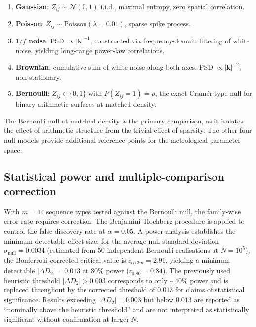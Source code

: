 \documentclass[final,1p,times]{elsarticle}
\theoremstyle{definition}
\begin{document}
\begin{enumerate}
  \item \textbf{Gaussian}: $Z_{ij} \sim \mathcal{N}(0,1)$ i.i.d.,
        maximal entropy, zero spatial correlation.
  \item \textbf{Poisson}: $Z_{ij} \sim \text{Poisson}(\lambda = 0.01)$,
        sparse spike process.
  \item \textbf{$1/f$ noise}: PSD $\propto |\mathbf{k}|^{-1}$,
        constructed via frequency-domain filtering of white noise,
        yielding long-range power-law correlations.
  \item \textbf{Brownian}: cumulative sum of white noise along both
        axes, PSD $\propto |\mathbf{k}|^{-2}$, non-stationary.
  \item \textbf{Bernoulli}: $Z_{ij} \in \{0,1\}$ with
        $P(Z_{ij}=1) = \rho$, the exact Cram\'er-type null for binary
        arithmetic surfaces at matched density.
\end{enumerate}

The Bernoulli null at matched density is the primary comparison, as it
isolates the effect of arithmetic structure from the trivial effect of
sparsity. The other four null models provide additional reference points
for the metrological parameter space.


\subsection{Statistical power and multiple-comparison correction}

With $m=14$ sequence types tested against the Bernoulli null, the
family-wise error rate requires correction. The Benjamini--Hochberg
procedure is applied to control the false discovery rate at
$\alpha = 0.05$. A power analysis establishes the minimum detectable
effect size: for the average null standard deviation
$\sigma_{\text{null}} = 0.0034$ (estimated from 50 independent
Bernoulli realisations at $N=10^5$), the Bonferroni-corrected
critical value is $z_{\alpha/2m} = 2.91$, yielding a minimum
detectable $|\Delta D_2| = 0.013$ at 80\% power
($z_{0.80} = 0.84$). The previously used heuristic threshold
$|\Delta D_2| > 0.003$ corresponds to only $\sim 40\%$ power and
is replaced throughout by the corrected threshold of $0.013$ for
claims of statistical significance. Results exceeding
$|\Delta D_2| = 0.003$ but below $0.013$ are reported as
``nominally above the heuristic threshold'' and are not interpreted
as statistically significant without confirmation at larger $N$.
\end{document}
